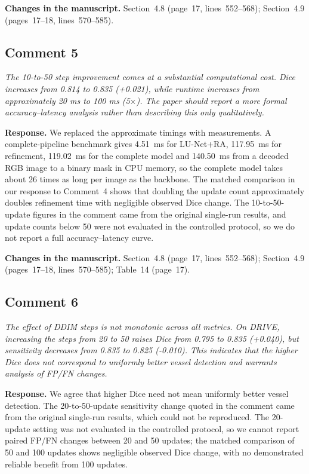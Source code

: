 \documentclass[11pt,a4paper]{article}
\newenvironment{revcomment}{\par\medskip\noindent\begin{minipage}{\linewidth}\itshape}{\end{minipage}\par\smallskip}
\begin{document}
\textbf{Changes in the manuscript.} Section~4.8 (page~17, lines~552--568); Section~4.9 (pages~17--18, lines~570--585).

\subsection*{Comment 5}
\begin{revcomment}The 10-to-50 step improvement comes at a substantial computational cost. Dice increases from 0.814 to 0.835 (+0.021), while runtime increases from approximately 20 ms to 100 ms (5$\times$). The paper should report a more formal accuracy--latency analysis rather than describing this only qualitatively.\end{revcomment}
\textbf{Response.} We replaced the approximate timings with measurements. A complete-pipeline benchmark gives 4.51~ms for LU-Net+RA, 117.95~ms for refinement, 119.02~ms for the complete model and 140.50~ms from a decoded RGB image to a binary mask in CPU memory, so the complete model takes about 26 times as long per image as the backbone. The matched comparison in our response to Comment~4 shows that doubling the update count approximately doubles refinement time with negligible observed Dice change. The 10-to-50-update figures in the comment came from the original single-run results, and update counts below 50 were not evaluated in the controlled protocol, so we do not report a full accuracy--latency curve.

\textbf{Changes in the manuscript.} Section~4.8 (page~17, lines~552--568); Section~4.9 (pages~17--18, lines~570--585); Table~14 (page~17).

\subsection*{Comment 6}
\begin{revcomment}The effect of DDIM steps is not monotonic across all metrics. On DRIVE, increasing the steps from 20 to 50 raises Dice from 0.795 to 0.835 (+0.040), but sensitivity decreases from 0.835 to 0.825 (-0.010). This indicates that the higher Dice does not correspond to uniformly better vessel detection and warrants analysis of FP/FN changes.\end{revcomment}
\textbf{Response.} We agree that higher Dice need not mean uniformly better vessel detection. The 20-to-50-update sensitivity change quoted in the comment came from the original single-run results, which could not be reproduced. The 20-update setting was not evaluated in the controlled protocol, so we cannot report paired FP/FN changes between 20 and 50 updates; the matched comparison of 50 and 100 updates shows negligible observed Dice change, with no demonstrated reliable benefit from 100 updates.
\end{document}

